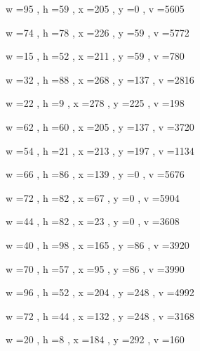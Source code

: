 \documentclass[11pt]{article}
\begin{document}
w =95 , h =59 , x =205 , y =0 , v =5605
\par
w =74 , h =78 , x =226 , y =59 , v =5772
\par
w =15 , h =52 , x =211 , y =59 , v =780
\par
w =32 , h =88 , x =268 , y =137 , v =2816
\par
w =22 , h =9 , x =278 , y =225 , v =198
\par
w =62 , h =60 , x =205 , y =137 , v =3720
\par
w =54 , h =21 , x =213 , y =197 , v =1134
\par
w =66 , h =86 , x =139 , y =0 , v =5676
\par
w =72 , h =82 , x =67 , y =0 , v =5904
\par
w =44 , h =82 , x =23 , y =0 , v =3608
\par
w =40 , h =98 , x =165 , y =86 , v =3920
\par
w =70 , h =57 , x =95 , y =86 , v =3990
\par
w =96 , h =52 , x =204 , y =248 , v =4992
\par
w =72 , h =44 , x =132 , y =248 , v =3168
\par
w =20 , h =8 , x =184 , y =292 , v =160
\par
\newpage
\end{document}
